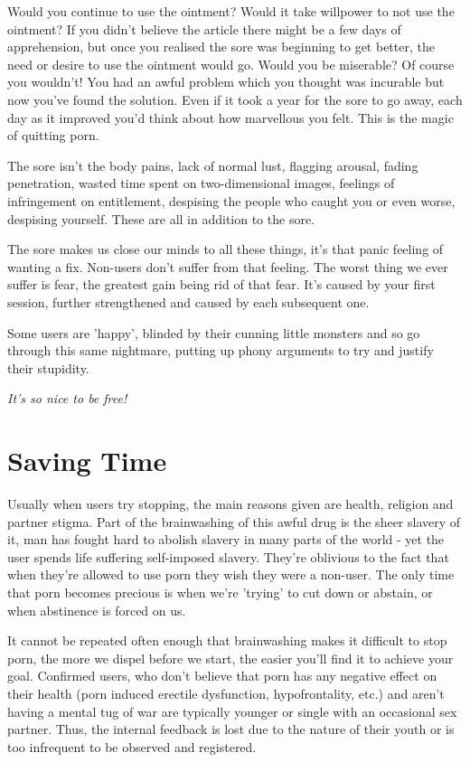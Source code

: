 \documentclass[
]{book}
\begin{document}
Would you continue to use the ointment? Would it take willpower to not use the ointment? If you didn't believe the article there might be a few days of apprehension, but once you realised the sore was beginning to get better, the need or desire to use the ointment would go. Would you be miserable? Of course you wouldn't! You had an awful problem which you thought was incurable but now you've found the solution. Even if it took a year for the sore to go away, each day as it improved you'd think about how marvellous you felt. This is the magic of quitting porn.

The sore isn't the body pains, lack of normal lust, flagging arousal, fading penetration, wasted time spent on two-dimensional images, feelings of infringement on entitlement, despising the people who caught you or even worse, despising yourself. These are all in addition to the sore.

The sore makes us close our minds to all these things, it's that panic feeling of wanting a fix. Non-users don't suffer from that feeling. The worst thing we ever suffer is fear, the greatest gain being rid of that fear. It's caused by your first session, further strengthened and caused by each subsequent one.

Some users are 'happy', blinded by their cunning little monsters and so go through this same nightmare, putting up phony arguments to try and justify their stupidity.

\emph{It's so nice to be free!}

\hypertarget{saving-time}{%
\chapter{Saving Time}\label{saving-time}}

Usually when users try stopping, the main reasons given are health, religion and partner stigma. Part of the brainwashing of this awful drug is the sheer slavery of it, man has fought hard to abolish slavery in many parts of the world - yet the user spends life suffering self-imposed slavery. They're oblivious to the fact that when they're allowed to use porn they wish they were a non-user. The only time that porn becomes precious is when we're 'trying' to cut down or abstain, or when abstinence is forced on us.

It cannot be repeated often enough that brainwashing makes it difficult to stop porn, the more we dispel before we start, the easier you'll find it to achieve your goal. Confirmed users, who don't believe that porn has any negative effect on their health (porn induced erectile dysfunction, hypofrontality, etc.) and aren't having a mental tug of war are typically younger or single with an occasional sex partner. Thus, the internal feedback is lost due to the nature of their youth or is too infrequent to be observed and registered.
\end{document}

